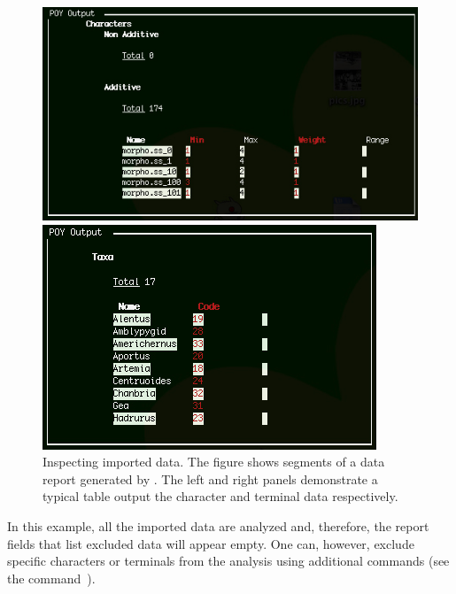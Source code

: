 \begin{figure}
\centering
\begin{minipage}[c]{0.52\textwidth}
   		\includegraphics[width=\textwidth]{doc/figures/report2.jpg}
\end{minipage}
\quad
\begin{minipage}[c]{0.44\textwidth}
	   	\includegraphics[width=\textwidth]{doc/figures/report3.jpg}
   	\end{minipage}
\caption{Inspecting imported data. The figure shows segments of a data report generated by . The left and right panels demonstrate a typical table output the character and terminal data respectively.}
\label{fig:reportdata}
\end{figure}

In this example, all the imported data are analyzed and, therefore, the report fields that list excluded data will appear empty. One can, however, exclude specific characters or terminals from the analysis using additional commands (see the command~).

